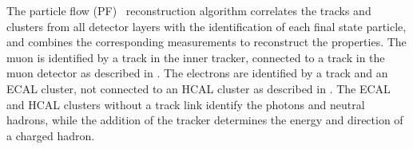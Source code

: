 The particle flow (PF)~\cite{CMS-PRF-14-001} reconstruction algorithm correlates the tracks and clusters from all detector layers with the identification of each final state particle, and combines the corresponding measurements to reconstruct the properties. The muon is identified by a track in the inner tracker, connected to a track in the muon detector as described in . The electrons are identified by a track and an ECAL cluster, not connected to an HCAL cluster as described in . The ECAL and HCAL clusters without a track link identify the photons and neutral hadrons, while the addition of the tracker determines the energy and direction of a charged hadron. 



